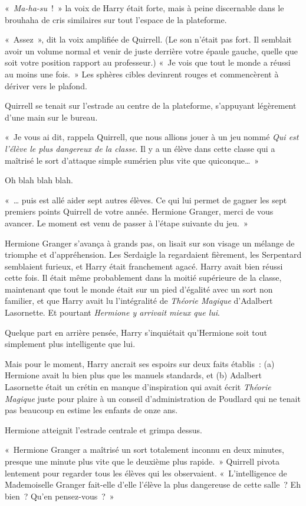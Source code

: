 «~\emph{Ma-ha-su}~!~» la voix de Harry était forte, mais à peine discernable dans le brouhaha de cris similaires sur tout l'espace de la plateforme.

«~Assez~», dit la voix amplifiée de Quirrell.
(Le son n'était pas fort. Il semblait avoir un volume normal et venir de juste derrière votre épaule gauche, quelle que soit votre position rapport au professeur.)
«~Je vois que tout le monde a réussi au moins une fois.~»
Les sphères cibles devinrent rouges et commencèrent à dériver vers le plafond.

Quirrell se tenait sur l'estrade au centre de la plateforme, s'appuyant légèrement d'une main sur le bureau.

«~Je vous ai dit, rappela Quirrell, que nous allions jouer à un jeu nommé \emph{Qui est l'élève le plus dangereux de la classe}.
Il y a un élève dans cette classe qui a maîtrisé le sort d'attaque simple sumérien plus vite que quiconque…~»

Oh blah blah blah.

«~… puis est allé aider sept autres élèves.
Ce qui lui permet de gagner les sept premiers points Quirrell de votre année.
Hermione Granger, merci de vous avancer.
Le moment est venu de passer à l'étape suivante du jeu.~»

Hermione Granger s'avança à grands pas, on lisait sur son visage un mélange de triomphe et d'appréhension.
Les Serdaigle la regardaient fièrement, les Serpentard semblaient furieux, et Harry était franchement agacé.
Harry avait bien réussi cette fois.
Il était même probablement dans la moitié supérieure de la classe, maintenant que tout le monde était sur un pied d'égalité avec un sort non familier, et que Harry avait lu l'intégralité de \emph{Théorie Magique} d'Adalbert Lasornette.
Et pourtant \emph{Hermione y arrivait mieux que lui}.

Quelque part en arrière pensée, Harry s'inquiétait qu'Hermione soit tout simplement plus intelligente que lui.

Mais pour le moment, Harry ancrait ses espoirs sur deux faits établis~: (a) Hermione avait lu bien plus que les manuels standards, et (b) Adalbert Lasornette était un crétin en manque d'inspiration qui avait écrit \emph{Théorie Magique} juste pour plaire à un conseil d'administration de Poudlard qui ne tenait pas beaucoup en estime les enfants de onze ans.

Hermione atteignit l'estrade centrale et grimpa dessus.

«~Hermione Granger a maîtrisé un sort totalement inconnu en deux minutes, presque une minute plus vite que le deuxième plus rapide.~»
Quirrell pivota lentement pour regarder tous les élèves qui les observaient.
«~L'intelligence de Mademoiselle Granger fait-elle d'elle l'élève la plus dangereuse de cette salle~?
Eh bien~? Qu'en pensez-vous~?~»

